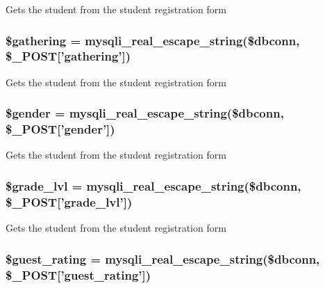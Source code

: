\-Gets the student from the student registration form \hypertarget{admin__view_2validate_2studentVal_8php_a0b341ac1da1798a6803878383a2a6086}{
\subsubsection[{\$gathering}]{\setlength{\rightskip}{0pt plus 5cm}\$gathering = mysqli\-\_\-real\-\_\-escape\-\_\-string(\$dbconn, \$\-\_\-\-P\-O\-S\-T\mbox{[}'gathering'\mbox{]})}}\label{admin__view_2validate_2studentVal_8php_a0b341ac1da1798a6803878383a2a6086}
\-Gets the student from the student registration form \hypertarget{admin__view_2validate_2studentVal_8php_a0f1d7cfb9dc6f494b9014885205fc47e}{
\subsubsection[{\$gender}]{\setlength{\rightskip}{0pt plus 5cm}\$gender = mysqli\-\_\-real\-\_\-escape\-\_\-string(\$dbconn, \$\-\_\-\-P\-O\-S\-T\mbox{[}'gender'\mbox{]})}}\label{admin__view_2validate_2studentVal_8php_a0f1d7cfb9dc6f494b9014885205fc47e}
\-Gets the student from the student registration form \hypertarget{admin__view_2validate_2studentVal_8php_a379014f2a48154febd53d5f95871dc14}{
\subsubsection[{\$grade\-\_\-lvl}]{\setlength{\rightskip}{0pt plus 5cm}\$grade\-\_\-lvl = mysqli\-\_\-real\-\_\-escape\-\_\-string(\$dbconn, \$\-\_\-\-P\-O\-S\-T\mbox{[}'grade\-\_\-lvl'\mbox{]})}}\label{admin__view_2validate_2studentVal_8php_a379014f2a48154febd53d5f95871dc14}
\-Gets the student from the student registration form \hypertarget{admin__view_2validate_2studentVal_8php_ade1951cffb40e000076f5d81e34e41d8}{
\subsubsection[{\$guest\-\_\-rating}]{\setlength{\rightskip}{0pt plus 5cm}\$guest\-\_\-rating = mysqli\-\_\-real\-\_\-escape\-\_\-string(\$dbconn, \$\-\_\-\-P\-O\-S\-T\mbox{[}'guest\-\_\-rating'\mbox{]})}}\label{admin__view_2validate_2studentVal_8php_ade1951cffb40e000076f5d81e34e41d8}
